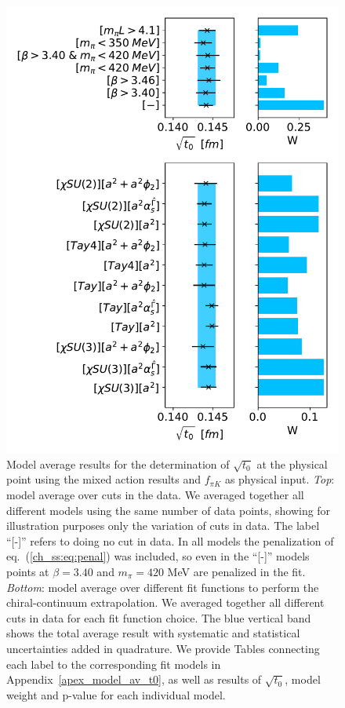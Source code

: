 \begin{figure}
    \centering
    \includegraphics[width=1.\textwidth]{./cap5/figs/BMA_tm_subav_c=1_cphi=0.0035.pdf}
    \caption{Model average results for the determination of $\sqrt{t_0}$ at the physical point using the mixed action results and $f_{\pi K}$ as physical input. \textit{Top}: model average over cuts in the data. We averaged together all different models using the same number of data points, showing for illustration purposes only the variation of cuts in data. The label ``[-]'' refers to doing no cut in data. In all models the penalization of eq.~(\ref{ch_ss:eq:penal}) was included, so even in the ``[-]'' models points at $\beta=3.40$ and $m_{\pi}=420$ MeV are penalized in the fit. \textit{Bottom}: model average over different fit functions to perform the chiral-continuum extrapolation. We averaged together all different cuts in data for each fit function choice. The blue vertical band shows the total average result with systematic and statistical uncertainties added in quadrature. We provide Tables connecting each label to the corresponding fit models in Appendix~\ref{apex_model_av_t0}, as well as results of $\sqrt{t_0}$, model weight and p-value for each individual model.}
    \label{ch_ss:fig:BMA_tm}
\end{figure}

